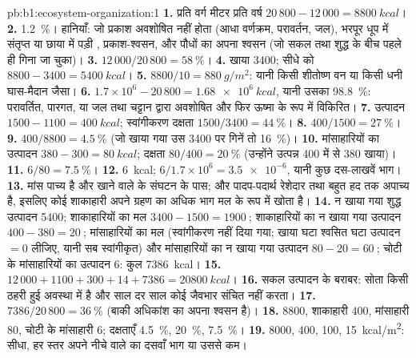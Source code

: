 \begin{solution}{pb:b1:ecosystem-organization:1}
\textbf{1.} प्रति वर्ग मीटर प्रति वर्ष $20\,800 - 12\,000 = \qty{8800}{kcal}$।
\textbf{2.} \qty{1.2}{\%}। हानियाँ: जो प्रकाश अवशोषित नहीं होता (आधा
वर्णक्रम, परावर्तन, जल), भरपूर धूप में संतृप्त या छाया में पड़ी ,
प्रकाश-श्वसन, और पौधों का अपना श्वसन (जो सकल तथा शुद्ध के बीच पहले ही गिना
जा चुका)।
\textbf{3.} $12\,000/20\,800 = \qty{58}{\%}$।
\textbf{4.} खाया \qty{3400}{}; सीधे  को
$8800 - 3400 = \qty{5400}{kcal}$।
\textbf{5.} $8800/10 = \qty{880}{g/m^2}$: यानी किसी शीतोष्ण वन या किसी
धनी घास-मैदान जैसा।
\textbf{6.} $1.7\times 10^6 - 20\,800 = \qty{1.68e6}{kcal}$, यानी उसका
\qty{98.8}{\%}: परावर्तित, पारगत, या जल तथा चट्टान द्वारा अवशोषित और
फिर ऊष्मा के रूप में विकिरित।
\textbf{7.} उत्पादन $1500 - 1100 = \qty{400}{kcal}$; स्वांगीकरण
दक्षता $1500/3400 = \qty{44}{\%}$।
\textbf{8.} $400/1500 = \qty{27}{\%}$।
\textbf{9.} $400/8800 = \qty{4.5}{\%}$ (जो खाया गया उस \qty{3400}{} पर
गिनें तो \qty{16}{\%})।
\textbf{10.} मांसाहारियों का उत्पादन $380 - 300 = \qty{80}{kcal}$;
दक्षता $80/400 = \qty{20}{\%}$ (उन्होंने उत्पन्न \qty{400}{} में से
\qty{380}{} खाया)।
\textbf{11.} $6/80 = \qty{7.5}{\%}$।
\textbf{12.} \qty{6}{kcal}; $6/1.7\times 10^6 = \num{3.5e-6}$, यानी कुछ
दस-लाखवें भाग।
\textbf{13.} मांस पाच्य है और खाने वाले के संघटन के पास; और
पादप-पदार्थ रेशेदार तथा बहुत हद तक अपाच्य है, इसलिए कोई शाकाहारी
अपने ग्रहण का अधिक भाग मल के रूप में खोता है।
\textbf{14.} न खाया गया शुद्ध उत्पादन \qty{5400}{}; शाकाहारियों का मल
$3400 - 1500 = \qty{1900}{}$; शाकाहारियों का न खाया गया उत्पादन
$400 - 380 = \qty{20}{}$; मांसाहारियों का मल (स्वांगीकरण नहीं दिया गया;
खाया घटा श्वसित घटा उत्पादन $= 0$ लीजिए, यानी सब स्वांगीकृत)
और मांसाहारियों का न खाया गया उत्पादन $80 - 20 = \qty{60}{}$; चोटी के
मांसाहारियों का उत्पादन \qty{6}{}: कुल \qty{7386}{kcal}।
\textbf{15.} $12\,000 + 1100 + 300 + 14 + 7386 = \qty{20800}{kcal}$।
\textbf{16.} सकल उत्पादन के बराबर: सोता किसी ठहरी हुई
अवस्था में है और साल दर साल कोई जैवभार संचित नहीं करता।
\textbf{17.} $7386/20\,800 = \qty{36}{\%}$ (बाकी अधिकांश
 का अपना श्वसन है)।
\textbf{18.}  \qty{8800}{}, शाकाहारी \qty{400}{}, मांसाहारी
\qty{80}{}, चोटी के मांसाहारी \qty{6}{}; दक्षताएँ \qty{4.5}{\%},
\qty{20}{\%}, \qty{7.5}{\%}।
\textbf{19.} \qty{8000}{}, \qty{400}{}, \qty{100}{}, \qty{15}{kcal/m^2}:
सीधा, हर स्तर अपने नीचे वाले का दसवाँ भाग या उससे कम।

\end{solution}

